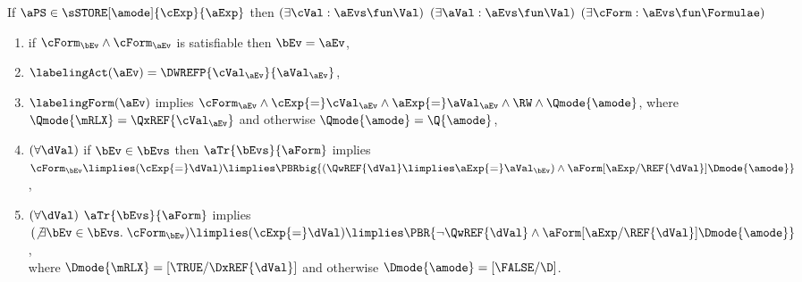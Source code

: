 \noindent
If $\aPS \in \sSTORE[\amode]{\cExp}{\aExp}$ then
$(\exists\cVal:\aEvs\fun\Val)$
$(\exists\aVal:\aEvs\fun\Val)$
$(\exists\cForm:\aEvs\fun\Formulae)$
\begin{enumerate}
\item if $\cForm_\bEv\land\cForm_\aEv$ is satisfiable then $\bEv=\aEv$,
\item $\labelingAct(\aEv) = \DWREFP{\cVal_\aEv}{\aVal_\aEv}$,
\item 
  $\labelingForm(\aEv)$ implies
  \begin{math}
    \cForm_\aEv
    \land \cExp{=}\cVal_\aEv
    \land \aExp{=}\aVal_\aEv
    \land \RW
    \land \Qmode{\amode}
  \end{math},
  where
  $\Qmode{\mRLX}=\QxREF{\cVal_\aEv}$ and otherwise $\Qmode{\amode}=\Q{\amode}$, %
\item
  \begin{math}
    (\forall\dVal)
  \end{math}
  if
  $\bEv\in\bEvs$
  then
  $\aTr{\bEvs}{\aForm}$ implies 
  \begin{math}
    \cForm_\bEv
    \limplies (\cExp{=}\dVal)
    \limplies \PBRbig{
      (\QwREF{\dVal} \limplies \aExp{=}\aVal_\bEv)
      \land \aForm [\aExp/\REF{\dVal}]\Dmode{\amode}
    }
  \end{math},
\item %
  \begin{math}
    (\forall\dVal)
  \end{math}
  $\aTr{\bEvs}{\aForm}$ implies 
  \begin{math}
    (\not\exists\bEv\in\bEvs.\; \cForm_\bEv)
    \limplies (\cExp{=}\dVal)
    \limplies \PBR{
      \lnot\QwREF{\dVal}
      \land \aForm [\aExp/\REF{\dVal}]\Dmode{\amode}
    }
  \end{math},
  \\ where 
  $\Dmode{\mRLX}=[\TRUE/\DxREF{\dVal}]$ and otherwise
  $\Dmode{\amode}=[\FALSE/\D]$. %
\end{enumerate}
